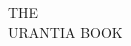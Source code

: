 \begin{center}
{
\bibcovertitlefont
THE\\[1ex]
\fontsize{24}{24}\selectfont
URANTIA BOOK\\
}
\titlesepbig\\
\end{center}

\titleframe

\newpage

